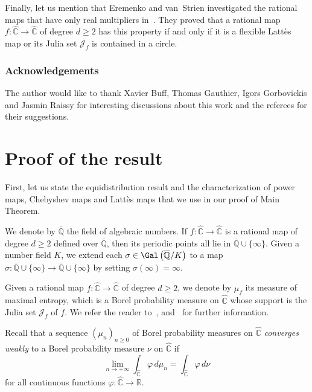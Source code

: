 Finally, let us mention that Eremenko and van~Strien investigated the rational maps that have only real multipliers in~\cite{EvS2011}. They proved that a rational map $f \colon \widehat{\mathbb{C}} \to \widehat{\mathbb{C}}$ of degree $d \geq 2$ has this property if and only if it is a flexible Lattès map or its Julia set $\mathcal{J}_{f}$ is contained in a circle.

\subsubsection*{Acknowledgements}
The author would like to thank Xavier Buff, Thomas Gauthier, Igors Gorbovickis and Jasmin Raissy for interesting discussions about this work and the referees for their suggestions.

\section{Proof of the result}

First, let us state the equidistribution result and the characterization of power maps, Chebyshev maps and Lattès maps that we use in our proof of Main Theorem.

We denote by $\overline{\mathbb{Q}}$ the field of algebraic numbers. If $f \colon \widehat{\mathbb{C}} \to \widehat{\mathbb{C}}$ is a rational map of degree $d \geq 2$ defined over $\overline{\mathbb{Q}}$, then its periodic points all lie in $\overline{\mathbb{Q}} \cup \lbrace \infty \rbrace$. Given a number field $K$, we extend each $\sigma \in \Gal\left(\overline{\mathbb{Q}}/K \right)$ to a map $\sigma \colon \overline{\mathbb{Q}} \cup \lbrace \infty \rbrace \to \overline{\mathbb{Q}} \cup \lbrace \infty \rbrace$ by setting $\sigma(\infty) = \infty$.

Given a rational map $f \colon \widehat{\mathbb{C}} \to \widehat{\mathbb{C}}$ of degree $d \geq 2$, we denote by $\mu_{f}$ its measure of maximal entropy, which is a Borel probability measure on $\widehat{\mathbb{C}}$ whose support is the Julia set $\mathcal{J}_{f}$ of $f$. We refer the reader to~\cite{FLM1983}, \cite{L1983} and~\cite{M1983} for further information.

Recall that a sequence $\left(\mu_{n} \right)_{n \geq 0}$ of Borel probability measures on $\widehat{\mathbb{C}}$ \emph{converges weakly} to a Borel probability measure $\nu$ on $\widehat{\mathbb{C}}$ if
\[
\lim_{n \to +\infty} \int_{\widehat{\mathbb{C}}} \varphi \, d\mu_{n} = \int_{\widehat{\mathbb{C}}} \varphi \, d\nu
\]
for all continuous functions $\varphi \colon \widehat{\mathbb{C}} \to \mathbb{R}$.

